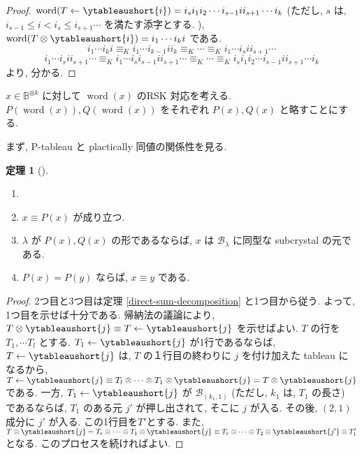 \documentclass[
  a4paper, 
  12pt,
  ja=standard,
  xelatex,
  left=30truemm,
  right=30truemm,
  titlepage 
]{bxjsarticle}
\theoremstyle{definition}
\newtheorem{thm}{定理}[section]
\begin{document}
\begin{proof}
  $\operatorname{word}(T \leftarrow \ytableaushort{i}) = i_s i_1 i_2 \cdots i_{s - 1} i i_{s + 1} \cdots i_k$
  (ただし, $s$ は, $i_{s - 1} \leq i < i_{s} \leq i_{s + 1} \cdots$ を満たす添字とする. ),
  $\operatorname{word}(T \otimes \ytableaushort{i}) = i_1 \cdots i_k i$ である.
  $$i_1 \cdots i_k i \equiv_{K} i_1 \cdots i_{k -1} i i_k \equiv_{K} \cdots \equiv_{K} i_1 \cdots i_{s } i i_{s + 1} \cdots$$
  $$i_1 \cdots i_{s } i i_{s + 1} \cdots \equiv_{K} i_1 \cdots i_s i_{s -1} i i_{s + 1} \cdots \equiv_{K} \cdots \equiv_{K} i_s i_1 i_2 \cdots i_{s - 1} i i_{s + 1} \cdots i_k$$
  より, 分かる.
\end{proof}

$x \in \mathbb{B}^{\otimes k}$ に対して
$\operatorname{word}(x)$ のRSK 対応を考える.
$P(\operatorname{word}(x)), Q(\operatorname{word}(x))$
をそれぞれ $P(x), Q(x)$ と略すことにする.

まず, P-tableau と plactically 同値の関係性を見る.

\begin{thm} [{\cite[定理8.6]{b2}}] \label{crystal-and-p-tableau}
  \begin{enumerate}
    \item[]
    \item $x \equiv P(x) $ が成り立つ.
    \item $\lambda$ が $P(x), Q(x)$ の形であるならば, $x$ は $\mathcal{B}_\lambda $
    に同型な subcrystal の元である.
    \item $P(x) = P(y)$ ならば, $x \equiv y$ である.
  \end{enumerate}
\end{thm}

\begin{proof}
  2つ目と3つ目は定理 \ref{direct-sum-decomposition} と1つ目から従う.
  よって, 1つ目を示せば十分である.
  帰納法の議論により, $T \otimes \ytableaushort{j} \equiv T \leftarrow \ytableaushort{j} $ を示せばよい.
  $T$ の行を $T_1, \cdots T_l$ とする.
  $T_1 \leftarrow \ytableaushort{j}$ が1行であるならば, $T \leftarrow \ytableaushort{j}$ は, $T$ の１行目の終わりに 
  $j$ を付け加えた tableau になるから,  $T \leftarrow \ytableaushort{j} \equiv T_l \otimes \cdots \otimes T_1 \otimes \ytableaushort{j} = T \otimes \ytableaushort{j}$ である.
  一方, $T_1 \leftarrow \ytableaushort{j}$ が $\mathcal{B}_{(k_1, 1)}$ (ただし, $k_1$ は, $T_1$ の長さ) であるならば,
  $T_1$ のある元 $j'$ が押し出されて, そこに $j$ が入る. その後, $(2, 1)$ 成分に $j'$ が入る. 
  この1行目を$T'$とする. また,
  $T \otimes \ytableaushort{j} = T_r \otimes \cdots \otimes T_1 \otimes \ytableaushort{j} \equiv T_r \otimes \cdots \otimes T_2 \otimes \ytableaushort{{j'}} \otimes T_1'$
  となる. このプロセスを続ければよい.
\end{proof}
\end{document}
